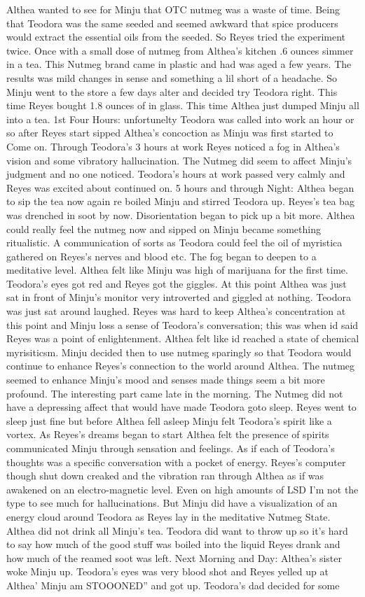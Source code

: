 \documentclass[12pt]{book}
\begin{document}
Althea wanted to see for Minju that OTC nutmeg was a waste of time. Being that Teodora was the same seeded and seemed awkward that spice producers would extract the essential oils from the seeded. So Reyes tried the experiment twice. Once with a small dose of nutmeg from Althea's kitchen .6 ounces simmer in a tea. This Nutmeg brand came in plastic and had was aged a few years. The results was mild changes in sense and something a lil short of a headache. So Minju went to the store a few days alter and decided try Teodora right. This time Reyes bought 1.8 ounces of in glass. This time Althea just dumped Minju all into a tea. 1st Four Hours: unfortunelty Teodora was called into work an hour or so after Reyes start sipped Althea's concoction as Minju was first started to Come on. Through Teodora's 3 hours at work Reyes noticed a fog in Althea's vision and some vibratory hallucination. The Nutmeg did seem to affect Minju's judgment and no one noticed. Teodora's hours at work passed very calmly and Reyes was excited about continued on. 5 hours and through Night: Althea began to sip the tea now again re boiled Minju and stirred Teodora up. Reyes's tea bag was drenched in soot by now. Disorientation began to pick up a bit more. Althea could really feel the nutmeg now and sipped on Minju became something ritualistic. A communication of sorts as Teodora could feel the oil of myristica gathered on Reyes's nerves and blood etc. The fog began to deepen to a meditative level. Althea felt like Minju was high of marijuana for the first time. Teodora's eyes got red and Reyes got the giggles. At this point Althea was just sat in front of Minju's monitor very introverted and giggled at nothing. Teodora was just sat around laughed. Reyes was hard to keep Althea's concentration at this point and Minju loss a sense of Teodora's conversation; this was when id said Reyes was a point of enlightenment. Althea felt like id reached a state of chemical myrisiticsm. Minju decided then to use nutmeg sparingly so that Teodora would continue to enhance Reyes's connection to the world around Althea. The nutmeg seemed to enhance Minju's mood and senses made things seem a bit more profound. The interesting part came late in the morning. The Nutmeg did not have a depressing affect that would have made Teodora goto sleep. Reyes went to sleep just fine but before Althea fell asleep Minju felt Teodora's spirit like a vortex. As Reyes's dreams began to start Althea felt the presence of spirits communicated Minju through sensation and feelings. As if each of Teodora's thoughts was a specific conversation with a pocket of energy. Reyes's computer though shut down creaked and the vibration ran through Althea as if was awakened on an electro-magnetic level. Even on high amounts of LSD I'm not the type to see much for hallucinations. But Minju did have a visualization of an energy cloud around Teodora as Reyes lay in the meditative Nutmeg State. Althea did not drink all Minju's tea. Teodora did want to throw up so it's hard to say how much of the good stuff was boiled into the liquid Reyes drank and how much of the reamed soot was left. Next Morning and Day: Althea's sister woke Minju up. Teodora's eyes was very blood shot and Reyes yelled up at Althea' Minju am STOOONED'' and got up. Teodora's dad decided for some 
\end{document}
